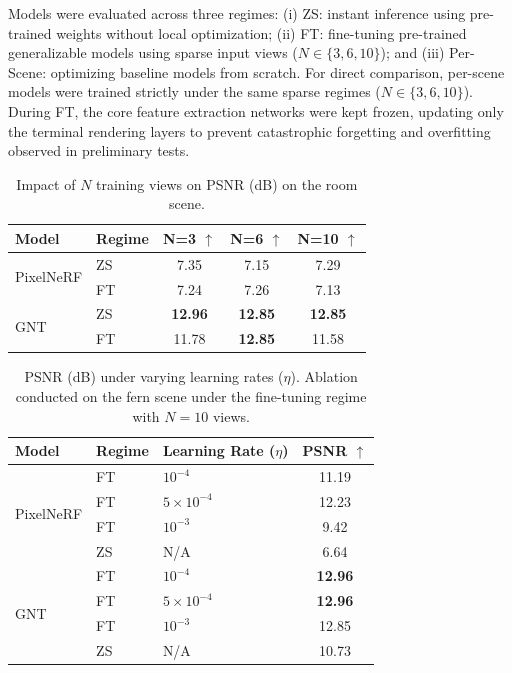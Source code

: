 Models were evaluated across three regimes: (i) ZS: instant inference using pre-trained weights without local optimization; (ii) FT: fine-tuning pre-trained generalizable models using sparse input views ($N \in \{3, 6, 10\}$); and (iii) Per-Scene: optimizing baseline models from scratch. For direct comparison, per-scene models were trained strictly under the same sparse regimes ($N \in \{3, 6, 10\}$). During FT, the core feature extraction networks were kept frozen, updating only the terminal rendering layers to prevent catastrophic forgetting and overfitting observed in preliminary tests.

\begin{table}[H]
\centering
\caption{Impact of $N$ training views on PSNR (dB) on the room scene.}
\label{tab:room_n_views}
\scriptsize
\begin{tabular*}{\linewidth}{@{\extracolsep{\fill}}llccc}
\toprule
Model & Regime & N=3 $\uparrow$ & N=6 $\uparrow$ & N=10 $\uparrow$ \\
\midrule
\multirow{2}{*}{PixelNeRF}
 & ZS & 7.35 & 7.15 & 7.29 \\
 & FT & 7.24 & 7.26 & 7.13 \\
\midrule
\multirow{2}{*}{GNT}
 & ZS & \textbf{12.96} & \textbf{12.85} & \textbf{12.85} \\
 & FT & 11.78 & \textbf{12.85} & 11.58 \\
\bottomrule
\end{tabular*}
\end{table}

\begin{table}[H]
\centering
\caption{PSNR (dB) under varying learning rates ($\eta$). Ablation conducted on the fern scene under the fine-tuning regime with $N = 10$ views.}
\label{tab:ablation_lr}
\scriptsize
\begin{tabular*}{\linewidth}{@{\extracolsep{\fill}}lllc}
\toprule
Model & Regime & Learning Rate ($\eta$) & PSNR $\uparrow$ \\
\midrule
\multirow{4}{*}{PixelNeRF}
 & FT & $10^{-4}$ & 11.19 \\
 & FT & $5\times10^{-4}$ & 12.23 \\
 & FT & $10^{-3}$ & 9.42 \\
 & ZS & N/A & 6.64 \\
\midrule
\multirow{4}{*}{GNT}
 & FT & $10^{-4}$ & \textbf{12.96}\\
 & FT & $5\times10^{-4}$ & \textbf{12.96}\\
 & FT & $10^{-3}$ & 12.85\\
 & ZS & N/A & 10.73 \\
\bottomrule
\end{tabular*}
\end{table}

